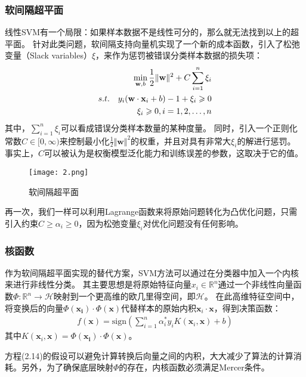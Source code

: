 \subsubsection{软间隔超平面}

线性SVM有一个局限：如果样本数据不是线性可分的，那么就无法找到以上的超平面。
针对此类问题，软间隔支持向量机实现了一个新的成本函数，引入了松弛变量（Slack variables）$\xi$，来作为惩罚被错误分类样本数据的损失项：
\begin{align}
    \min_{\mathbf{w},b}\frac{1}{2}\Vert\mathbf{w}\Vert^2+C\sum_{i=1}^n\xi_i\\
    s.t.\quad y_i(\mathbf{w}\cdot\mathbf{x}_i+b)-1+\xi_i\geq0\notag\\
    \xi_i\geq0,i=1,2,\ldots,n\notag
\end{align}
其中，$\sum_{i=1}^n\xi_i$可以看成错误分类样本数量的某种度量。
同时，引入一个正则化常数$C\in[0,\infty)$来控制最小化$\frac{1}{2}\Vert\mathbf{w}\Vert^2$的权重，并且对具有非常大$\xi_i$的解进行惩罚。
事实上，$C$可以被认为是权衡模型泛化能力和训练误差的参数，这取决于它的值。

\begin{figure}[ht]
    \centering
    \texttt{[image: 2.png]}
    \caption{软间隔超平面}
\end{figure}

再一次，我们一样可以利用Lagrange函数来将原始问题转化为凸优化问题，只需引入约束$C\geq\alpha_i\geq0$，因为松弛变量$\xi_i$对优化问题没有任何影响。

\subsubsection{核函数}

作为软间隔超平面实现的替代方案，SVM方法可以通过在分类器中加入一个内核来进行非线性分类。
其主要思想是将原始特征向量$x_i\in\mathbb{R}^n$通过一个非线性向量函数$\Phi: \mathbb{R}^n\to\mathcal{H}$映射到一个更高维的欧几里得空间，即$\mathcal{H}$。
在此高维特征空间中，将变换后的向量$\Phi(\mathbf{x_i})\cdot\Phi(\mathbf{x})$代替样本的原始内积$\mathbf{x}_i\cdot\mathbf{x}$，得到决策函数：
\begin{align}
    f(\mathbf{x})=\mathrm{sign}(\sum_{i=1}^n\alpha_i^*y_iK(\mathbf{x}_i,\mathbf{x})+b)
\end{align}
其中$K(\mathbf{x}_i,\mathbf{x})=\Phi(\mathbf{x_i})\cdot\Phi(\mathbf{x})$。

方程(2.14)的假设可以避免计算转换后向量之间的内积，大大减少了算法的计算消耗。另外，为了确保底层映射$\Phi$的存在，内核函数必须满足Mercer条件\cite{en1}。

